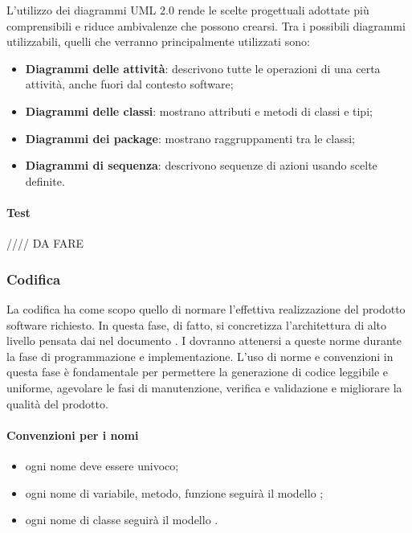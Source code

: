 L'utilizzo dei diagrammi UML 2.0 rende le scelte progettuali adottate più comprensibili e riduce ambivalenze che possono crearsi. Tra i possibili diagrammi utilizzabili, quelli che verranno principalmente utilizzati sono:
\begin{itemize}

\item \textbf{Diagrammi delle attività}: descrivono tutte le operazioni di una certa attività,  anche fuori dal contesto software;

\item \textbf{Diagrammi delle classi}: mostrano attributi e metodi di classi e tipi;

\item \textbf{Diagrammi dei package}: mostrano raggruppamenti tra le classi;

\item \textbf{Diagrammi di sequenza}: descrivono sequenze di azioni usando scelte definite.

\end{itemize}

\paragraph{Test}

//// DA FARE


\subsubsection{Codifica}

La codifica ha come scopo quello di normare l'effettiva realizzazione del prodotto software richiesto. In questa fase, di fatto, si concretizza l'architettura di alto livello pensata dai \progs{} nel documento \PdQ{}. I \progrs{} dovranno attenersi a queste norme durante la fase di programmazione e implementazione.  L'uso di norme e convenzioni in questa fase è fondamentale per permettere la generazione di codice leggibile e uniforme, agevolare le fasi di manutenzione, verifica e validazione e migliorare la qualità del prodotto.

\paragraph{Convenzioni per i nomi}
\begin{itemize}
	\item ogni nome deve essere univoco;
	\item ogni nome di variabile, metodo, funzione seguirà il modello ;
	\item ogni nome di classe seguirà il modello .
\end{itemize}

